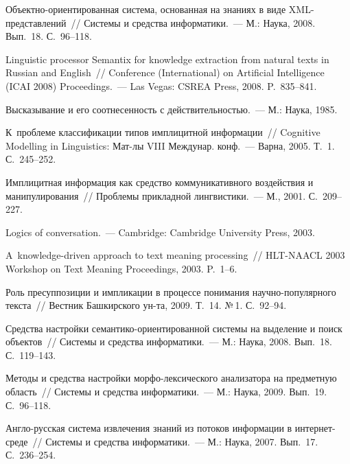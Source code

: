 \begin{multicols}{2}
{{\begin{thebibliography}{99}
Объектно-ориен\-ти\-ро\-ван\-ная сис\-те\-ма, основанная на знаниях в виде 
XML-пред\-став\-ле\-ний~// Системы и средства информатики.~--- М.: Наука, 
2008. Вып.~18. С.~96--118.

Linguistic processor Semantix for knowledge extraction from natural texts in Russian 
and English~//  Conference (International) on Artificial Intelligence (ICAI 2008) 
Proceedings.~--- Las Vegas: CSREA Press, 2008. P.~835--841.

Высказывание и его соотнесенность с действительностью.~--- М.: Наука, 1985.

К~проблеме классификации типов имплицитной информации~// Cognitive 
Modelling in Linguistics: Мат-лы VIII Междунар. конф.~--- Варна, 2005. Т.~1. 
С.~245--252.


Имплицитная информация как средство коммуникативного воздействия и 
манипулирования~// Проблемы прикладной лингвистики.~--- М., 2001. 
С.~209--227.

Logics of conversation.~--- Cambridge: Cambridge University Press, 2003.

A~knowledge-driven approach to text meaning processing~// HLT-NAACL 2003 
Workshop on Text Meaning Proceedings, 2003. P.~1--6.

Роль пресуппозиции и импликации в процессе понимания научно-популярного 
текста~// Вестник Башкирского ун-та, 2009. Т.~14. №\,1. С.~92--94.


Средства настройки се\-ман\-ти\-ко-ориен\-ти\-ро\-ван\-ной сис\-те\-мы на 
выделение и поиск объектов~// Системы и средства информатики.~--- М.: 
Наука, 2008. Вып.~18. С.~119--143.

Методы и средства настройки мор\-фо-лек\-си\-че\-ско\-го анализатора на 
предметную область~// Системы и средства информатики.~--- М.: Наука, 2009. 
Вып.~19. С.~96--118. 

Анг\-ло-рус\-ская сис\-те\-ма извлечения знаний из потоков информации в 
ин\-тер\-нет-сре\-де~// Системы и средства информатики.~--- М.: Наука, 2007. 
Вып.~17. С.~236--254.


\end{thebibliography}}}
\end{multicols}
